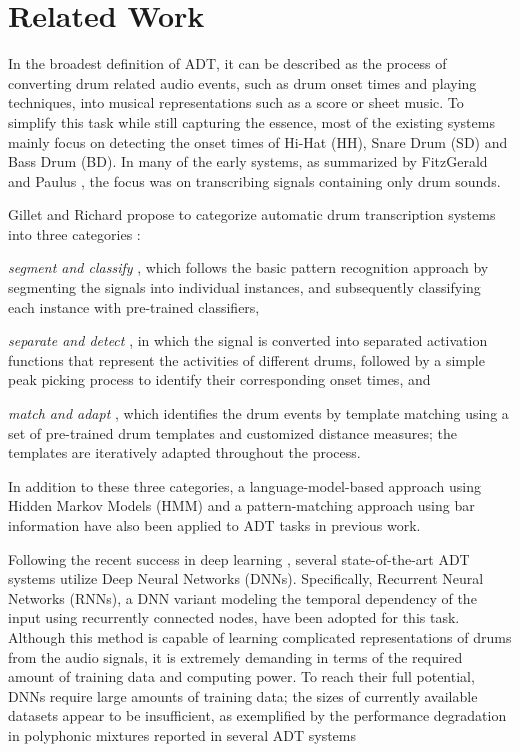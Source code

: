 \documentclass{article}
\begin{document}
\section{Related Work}\label{sec:related works}
In the broadest definition of ADT, it can be described as the process of converting drum related audio events, such as drum onset times and playing techniques, into musical representations such as a score or sheet music. To simplify this task while still capturing the essence, most of the existing systems mainly focus on detecting the onset times of Hi-Hat (HH), Snare Drum (SD) and Bass Drum (BD). In many of the early systems, as summarized by FitzGerald and Paulus \cite{FitzGerald2006}, the focus was on transcribing signals containing only drum sounds. %

Gillet and Richard propose to categorize automatic drum transcription systems into three categories \cite{Gillet2008}: 
\begin{inparaenum}[(i)]
	\item   \textit{segment and classify} \cite{Gillet2008, Gajhede2016}, which follows the basic pattern recognition approach by segmenting the signals into individual instances, and subsequently classifying each instance with pre-trained classifiers, 
    \item   \textit{separate and detect} \cite{Dittmar2014, Wu2015a, Roebel2015}, in which the signal is converted into separated activation functions that represent the activities of different drums, followed by a simple peak picking process to identify their corresponding onset times, and
    \item   \textit{match and adapt} \cite{Yoshii2007b}, which identifies the drum events by template matching using a set of pre-trained drum templates and customized distance measures; the templates are iteratively adapted throughout the process. 
\end{inparaenum} 
In addition to these three categories, a language-model-based approach using Hidden Markov Models (HMM) \cite{Paulus2009a} and a pattern-matching approach using bar information \cite{Thompson2014} have also been applied to ADT tasks in previous work. 

Following the recent success in deep learning \cite{Hinton2006}, several state-of-the-art ADT systems utilize Deep Neural Networks (DNNs). Specifically, Recurrent Neural Networks (RNNs), a DNN variant modeling the temporal dependency of the input using recurrently connected nodes, have been adopted for this task\cite{Vogl2016, Southall2016, Vogl2017}. Although this method is capable of learning complicated representations of drums from the audio signals, it is extremely demanding in terms of the required amount of training data and computing power. To reach their full potential, DNNs require large amounts of training data; the sizes of currently available datasets appear to be insufficient, as exemplified by the performance degradation in polyphonic mixtures reported in several ADT systems\cite{Wu2015a, Southall2016, Vogl2017}
\end{document}
